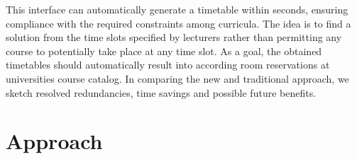 \documentclass{easychair}
\begin{document}
  This interface can automatically generate a timetable within seconds, ensuring compliance with the required constraints among curricula. 
  The idea is to find a solution from the time slots specified by lecturers rather than permitting any course to potentially take place at any time slot.
  As a goal, the obtained timetables should automatically result into according room reservations at universities course catalog.  
  In comparing the new and traditional approach, we sketch resolved redundancies, time savings and possible future benefits. 


\section{Approach}
\label{sec:approach}
\end{document}

